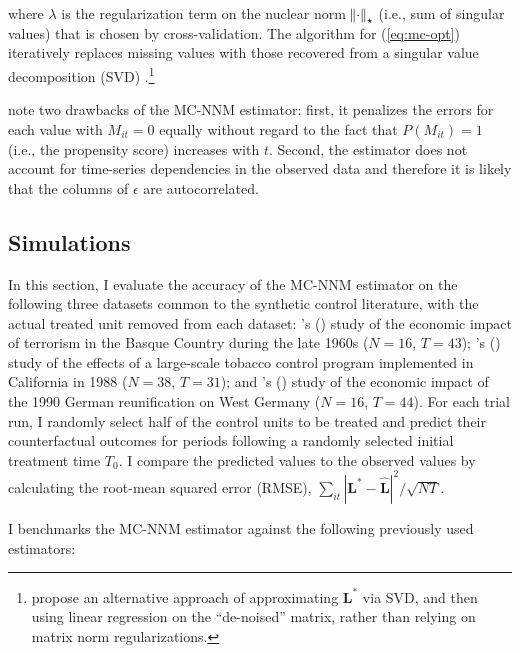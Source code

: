 \documentclass[12pt]{article}
\newcommand{\possessivecite}[1]{\citeauthor{#1}'s (\citeyear{#1})}
\begin{document}
\noindent
where $\lambda$ is the regularization term on the nuclear norm $\norm{\cdot}_\star$ (i.e., sum of singular values) that is chosen by cross-validation. The algorithm for (\ref{eq:mc-opt}) iteratively replaces missing values with those recovered from a singular value decomposition (SVD) \citep{mazumder2010spectral}.\footnote{\citet{amjad2018robust} propose an alternative approach of approximating $\mathbf{L^{*}}$ via SVD, and then using linear regression on the ``de-noised'' matrix, rather than relying on matrix norm regularizations.} 

\citet{athey2017matrix} note two drawbacks of the MC-NNM estimator: first, it penalizes the errors for each value with $M_{it} = 0$ equally without regard to the fact that $P(M_{it}) = 1$ (i.e., the propensity score) increases with $t$. Second, the estimator does not account for time-series dependencies in the observed data and therefore it is likely that the columns of $\epsilon$ are autocorrelated.

\subsection{Simulations} \label{sims}

In this section, I evaluate the accuracy of the MC-NNM estimator on the following three datasets common to the synthetic control literature, with the actual treated unit removed from each dataset: \possessivecite{abadie2003economic} study of the economic impact of terrorism in the Basque Country during the late 1960s ($N=16$, $T=43$); \possessivecite{abadie2010synthetic} study of the effects of a large-scale tobacco control program implemented in California in 1988 ($N=38$, $T=31$); and \possessivecite{abadie2015comparative} study of the economic impact of the 1990 German reunification on West Germany ($N=16$, $T=44$). For each trial run, I randomly select half of the control units to be treated and predict their counterfactual outcomes for periods following a randomly selected initial treatment time $T_0$. I compare the predicted values to the observed values by calculating the root-mean squared error (RMSE), $\sum_{it}|\mathbf{L^{*}} -\hat{\mathbf{L}}|^2 / \sqrt{NT}$. 

I benchmarks the MC-NNM estimator against the following previously used estimators:
\end{document}
